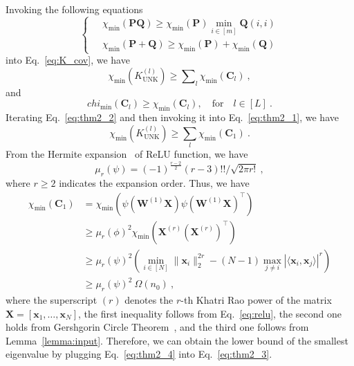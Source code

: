 \documentclass[review,10pt]{JMtemplate}
\begin{document}
\noindent Invoking the following equations
\begin{equation*} 
	\left\{~\begin{aligned}
		&\chi_{\min}(\mathbf{P}\mathbf{Q}) \geq \chi_{\min}(\mathbf{P}) \min_{i\in[m]} \mathbf{Q}(i,i)  \\
		&\chi_{\min}(\mathbf{P}+\mathbf{Q}) \geq \chi_{\min}(\mathbf{P}) + \chi_{\min}(\mathbf{Q}) 
	\end{aligned} \right.
\end{equation*}
into Eq.~\eqref{eq:K_cov}, we have
\begin{equation}  \label{eq:thm2_1}
    \chi_{\min}( K_{\textrm{UNK}}^{(l)} ) \geq \sum\nolimits_{l} \chi_{\min} \left( \mathbf{C}_{l} \right) \ ,
\end{equation}
and
\begin{equation}  \label{eq:thm2_2}
    chi_{\min} \left( \mathbf{C}_{l}\right) \geq \chi_{\min} \left( \mathbf{C}_{l} \right), \quad\text{for}\quad l \in [L] \ .
\end{equation}
Iterating Eq.~\eqref{eq:thm2_2} and then invoking it into Eq.~\eqref{eq:thm2_1}, we have
\begin{equation} \label{eq:thm2_3}
	\chi_{\min} \left( K_{\textrm{UNK}}^{(l)} \right) \geq \sum_l \chi_{\min}\left( \mathbf{C}_1 \right) \ .
\end{equation}
From the Hermite expansion~\cite{zhang2021:arise} of ReLU function, we have
\begin{equation} \label{eq:relu}
	\mu_{r}(\psi) = (-1)^{\frac{r-2}{2}} (r-3)!! / \sqrt{2 \pi r!} \ ,
\end{equation}
where $r \geq 2$ indicates the expansion order. Thus, we have
\begin{equation} \label{eq:thm2_4}
	\begin{aligned}
		\chi_{\min}\left( \mathbf{C}_1 \right) &= \chi_{\min}\left( \psi(\mathbf{W}^{(1)}\mathbf{X}) \psi(\mathbf{W}^{(1)}\mathbf{X})^{\top} \right) \\
		&\geq \mu_{r}(\phi)^2 \chi_{\min}\left( \mathbf{X}^{(r)} \left( \mathbf{X}^{(r)} \right)^{\top} \right) \\
		&\geq \mu_{r}(\psi)^2 \left( \min_{i\in[N]} \|\boldsymbol{x}_i\|_2^{2r} - (N-1) \max_{j\neq i} |\langle \boldsymbol{x}_i,\boldsymbol{x}_j \rangle|^r \right) \\
		&\geq \mu_{r}(\psi)^2 ~\Omega(n_0) \ ,
	\end{aligned}
\end{equation}
where the superscript $(r)$ denotes the $r$-th Khatri Rao power of the matrix $\mathbf{X}=[\boldsymbol{x}_1, \dots,\boldsymbol{x}_N]$, the first inequality follows from Eq.~\eqref{eq:relu}, the second one holds from Gershgorin Circle Theorem~\cite{salas1999gershgorin}, and the third one follows from Lemma~\ref{lemma:input}. Therefore, we can obtain the lower bound of the smallest eigenvalue by plugging Eq.~\eqref{eq:thm2_4} into Eq.~\eqref{eq:thm2_3}.
\end{document}
